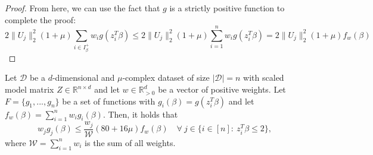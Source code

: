 \begin{proof}
    From here, we can use the fact that $g$ is a strictly positive function
    to complete the proof:
    \begin{equation*}
        2 \lVert U_j \rVert_2^2 (1 + \mu) \sum_{i \in I_\beta^+} w_i g(z_i^T \beta)
        \leq 2 \lVert U_j \rVert_2^2 (1 + \mu) \sum_{i = 1}^n w_i g(z_i^T \beta)
        = 2 \lVert U_j \rVert_2^2 (1 + \mu) f_w(\beta)
    \end{equation*}
\end{proof}

\begin{lemma}
    \label{lemma:g-bounds-2}
    Let $\mathcal{D}$ be a $d$-dimensional and $\mu$-complex dataset of size
    $|\mathcal{D}|=n$ with scaled model matrix
    $Z \in \mathbb{R}^{n \times d}$ and let $w \in \mathbb{R}^d_{>0}$
    be a vector of positive weights.
    Let $F = \{g_1, ..., g_n\}$ be a set of functions with
    $g_i(\beta) = g(z_i^T \beta)$ and let
    $f_w(\beta) = \sum_{i=1}^n w_ig_i(\beta)$.
    Then, it holds that
    \begin{equation*}
        w_jg_j(\beta) \leq \frac{w_j}{\mathcal{W}}(80 + 16 \mu)f_w(\beta) \quad
        \forall\ j \in \{i \in [n]:\ z_i^T \beta \leq 2 \},
    \end{equation*}
    where $\mathcal{W} = \sum_{i=1}^n w_i$ is the sum of all weights.
\end{lemma}
